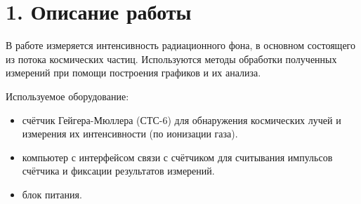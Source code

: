 \section* {1. Описание работы}


В работе измеряется интенсивность радиационного фона, в основном состоящего из потока космических частиц. Используются методы обработки полученных измерений при помощи построения графиков и их анализа.



Используемое оборудование:
\begin{itemize}
    \item счётчик Гейгера-Мюллера (СТС-6) для обнаружения космических лучей и измерения их интенсивности (по ионизации газа).
    \item компьютер с интерфейсом связи с счётчиком для считывания импульсов счётчика и фиксации результатов измерений.
    \item блок питания.
\end{itemize}


